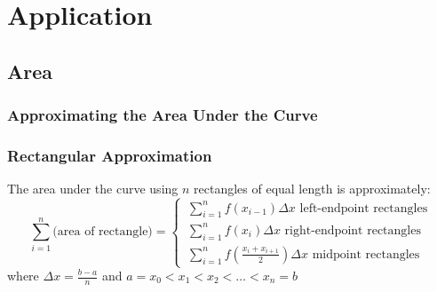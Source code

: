 \documentclass[11pt]{article}
\begin{document}
\section{Application}
\subsection{Area}
\subsubsection{Approximating the Area Under the Curve}
\subsubsection*{Rectangular Approximation}
The area under the curve using $n$ rectangles of equal length is approximately:
\[
    \sum_{i=1}^n\text{(area of rectangle)}=
    \begin{cases}
        \,\displaystyle\sum_{i=1}^nf(x_{i-1})\Delta x\text{ left-endpoint rectangles}\\[15pt]
        \,\displaystyle\sum_{i=1}^nf(x_i)\Delta x\text{ right-endpoint rectangles}\\[15pt]
        \,\displaystyle\sum_{i=1}^nf(\frac{x_i+x_{i+1}}{2})\Delta x\text{ midpoint rectangles}
    \end{cases}
\]where $\displaystyle\Delta x=\frac{b-a}{n}$ and $a=x_0<x_1<x_2<\dots<x_n=b$
\end{document}
